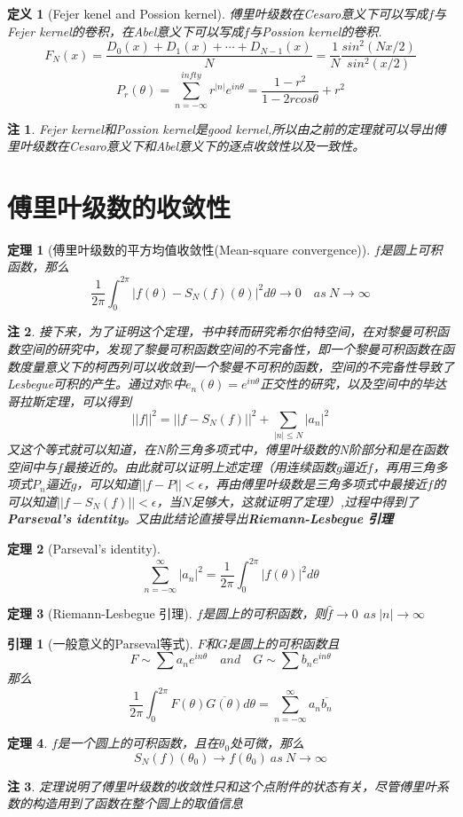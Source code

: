 \documentclass[UTF8]{ctexart}
\newtheorem{dfnt}{定义}
\newtheorem{thr}{定理}
\newtheorem{lemma}{引理}
\newtheorem*{note}{注}
\begin{document}
\begin{dfnt}[Fejer kenel and Possion kernel]
傅里叶级数在Cesaro意义下可以写成$f$与Fejer kernel的卷积，在Abel意义下可以写成$f$与Possion kernel的卷积.$$F_N(x) = \frac{D_0(x)+D_1(x)+\cdots+D_{N-1}(x)}{N} = \frac{1}{N}\frac{sin^2(Nx/2)}{sin^2(x/2)}$$$$P_r(\theta)=\sum_{n=-\infty}^{infty}r^{|n|}e^{in\theta}=\frac{1-r^2}{1-2rcos\theta}+r^2$$
\end{dfnt}
\begin{note}
Fejer kernel和Possion kernel是good kernel,所以由之前的定理就可以导出傅里叶级数在Cesaro意义下和Abel意义下的逐点收敛性以及一致性。
\end{note}

\section{傅里叶级数的收敛性}
\begin{thr}[傅里叶级数的平方均值收敛性(Mean-square convergence)]
$f$是圆上可积函数，那么$$\frac{1}{2\pi}\int^{2\pi}_0 |f(\theta) - S_N(f)(\theta)|^2 d\theta \rightarrow 0 \quad as \  N \rightarrow \infty$$
\end{thr}
\begin{note}
接下来，为了证明这个定理，书中转而研究希尔伯特空间，在对黎曼可积函数空间的研究中，发现了黎曼可积函数空间的不完备性，即一个黎曼可积函数在函数度量意义下的柯西列可以收敛到一个黎曼不可积的函数，空间的不完备性导致了Lesbegue可积的产生。通过对$\mathbb{R}$中$e_n(\theta) = e^{in\theta}$正交性的研究，以及空间中的毕达哥拉斯定理，可以得到$$||f||^2 = ||f-S_N(f)||^2 +\sum_{|n|\leq N}|a_n|^2$$又这个等式就可以知道，在N阶三角多项式中，傅里叶级数的N阶部分和是在函数空间中与$f$最接近的。由此就可以证明上述定理（用连续函数$g$逼近$f$，再用三角多项式$P_n$逼近$g$，可以知道$||f-P||<\epsilon$，再由傅里叶级数是三角多项式中最接近$f$的可以知道$||f-S_N(f)||<\epsilon$，当$N$足够大，这就证明了定理）,过程中得到了\textbf{Parseval's identity}。又由此结论直接导出\textbf{Riemann-Lesbegue 引理}
\end{note}
\begin{thr}[Parseval's identity]
$$\sum_{n=-\infty}^{\infty} |a_n|^2 = \frac{1}{2\pi}\int^{2\pi}_0 |f(\theta)|^2 d\theta$$
\end{thr}
\begin{thr}[Riemann-Lesbegue 引理]
$f$是圆上的可积函数，则$\hat{f} \rightarrow 0 \ \ as \ |n| \rightarrow \infty$
\end{thr}
\begin{lemma}[一般意义的Parseval等式]
$F$和$G$是圆上的可积函数且$$F \sim \sum a_n e^{in\theta} \quad and \quad G \sim \sum b_ne^{in\theta}$$那么$$\frac{1}{2\pi}\int_0^{2\pi}F(\theta)\overline{G(\theta)}d\theta = \sum_{n=-\infty}^{\infty}a_n\overline{b_n}$$
\end{lemma}
\begin{thr}
$f$是一个圆上的可积函数，且在$\theta_0$处可微，那么$$S_N(f)(\theta_0) \rightarrow f(\theta_0) \ as \  N \rightarrow \infty$$
\end{thr}
\begin{note}
定理说明了傅里叶级数的收敛性只和这个点附件的状态有关，尽管傅里叶系数的构造用到了函数在整个圆上的取值信息
\end{note}
\end{document}
